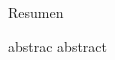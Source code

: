\begin{center}
	\begin{minipage}{0.85\linewidth}
		\begin{center}
			Resumen
		\end{center}
		\vspace{-0.5cm}
		abstrac
		abstract
	\end{minipage}
\end{center}
